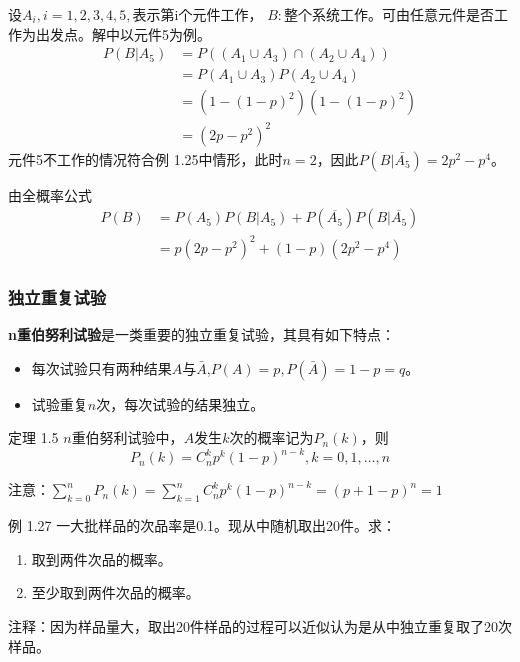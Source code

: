 \documentclass{beamer}
\begin{document}
	\begin{frame}
		设$A_i, i = 1, 2, 3, 4, 5,$表示第i个元件工作， $B:\text{整个系统工作}$。可由任意元件是否工作为出发点。解中以元件5为例。
		\begin{align}
			P(B | A_5) & = P((A_1 \cup A_3) \cap (A_2 \cup A_4)) \\ 
			& = P(A_1 \cup A_3) P(A_2 \cup A_4) \\
			& = (1 - (1 - p) ^ 2)(1 - (1 - p) ^ 2) \\
			& = (2p - p ^ 2) ^ 2
		\end{align}
		元件5不工作的情况符合例 1.25中情形，此时$n = 2$，因此$P(B | \bar{A_5}) = 2p^2 - p^4$。
		
		由全概率公式
		\begin{align}
			P(B) & = P(A_5)P(B | A_5) + P(\overline{A_5})P(B | \overline{A_5}) \\
			& = p(2p - p ^ 2) ^ 2 + (1 - p)(2p^2 - p^4)
		\end{align}
	\end{frame}
	
	\begin{frame}
		\frametitle{独立重复试验}
		\textbf{n重伯努利试验}是一类重要的独立重复试验，其具有如下特点：
		\begin{itemize}
			\item 每次试验只有两种结果$A$与$\bar{A}$,$P(A) = p, P(\bar{A}) = 1 - p = q$。
			\item 试验重复$n$次，每次试验的结果独立。
		\end{itemize}
	\end{frame}
	
	\begin{frame}
		定理 1.5 $n$重伯努利试验中，$A$发生$k$次的概率记为$P_n(k)$，则
		\[
		P_n(k) = C_n^k p^k(1 - p)^{n - k}, k = 0, 1, \dots, n
		\]
		
		注意：$\sum_{k = 0}^{n}P_n(k) = \sum_{k = 1}^{n}C_n^k p^k(1 - p)^{n - k} = (p + 1 - p) ^ n = 1$
	\end{frame}
	
	\begin{frame}
		例 1.27 一大批样品的次品率是0.1。现从中随机取出20件。求：
		\begin{enumerate}
			\item 取到两件次品的概率。
			\item 至少取到两件次品的概率。
		\end{enumerate}
			注释：因为样品量大，取出20件样品的过程可以近似认为是从中独立重复取了20次样品。
	\end{frame}
	
\end{document}
